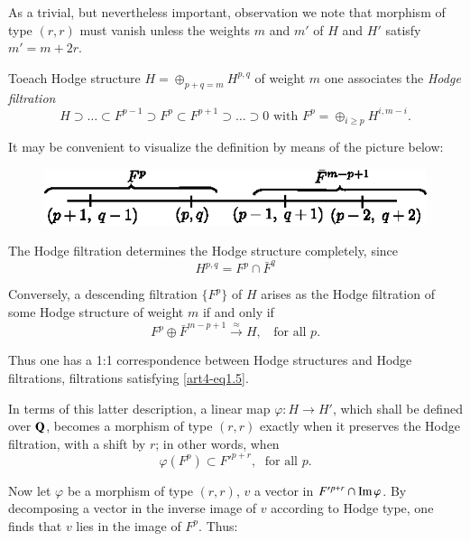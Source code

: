 As a trivial, but nevertheless important, observation we note that morphism of type $(r,r)$ must vanish unless the weights $m$ and $m'$ of $H$ and $H'$ satisfy $m'=m+2r$.

To\pageoriginale each Hodge structure $H = \oplus_{p+q =m} H^{p,q}$ of weight $m$ one associates the \textit{Hodge filtration}
\begin{equation}
H \supset \ldots \subset F^{p-1} \supset F^p \subset F^{p+1} \supset \ldots \supset 0 \text{ with } F^p = \oplus_{i \geqslant p} H^{i, m-i}.  \label{art4-eq1.3}
\end{equation}

It may be convenient to visualize the definition by means of the picture below:
\begin{figure}[H]
\centering
\includegraphics{art4-fig1.eps}
\end{figure}

The Hodge filtration determines the Hodge structure completely, since
\begin{equation}
H^{p,q} = F^p \cap \bar{F}^q \label{art4-eq1.4}
\end{equation}

Conversely, a descending filtration $\{F^p\}$ of $H$ arises as the Hodge filtration of some Hodge structure of weight $m$ if and only if
\begin{equation}
F^p \oplus \bar{F}^{m-p+1} \xrightarrow{\approx} H, \;\; \text{ for all } p.
\label{art4-eq1.5}
\end{equation}

Thus one has a 1:1 correspondence between Hodge structures and Hodge filtrations, \iec filtrations satisfying \eqref{art4-eq1.5}.

In terms of this latter description, a linear map $\varphi: H \to H'$, which shall be defined over $\mathbf{Q}$, becomes a morphism of type $(r, r)$ exactly when it preserves the Hodge filtration, with a shift by $r$; in other words, when 
\begin{equation}
\varphi (F^p) \subset F'^{p+r}, \;\text{ for all }p. \label{art4-eq1.6}
\end{equation}

Now let $\varphi$ be a morphism of type $(r, r)$, $v$ a vector in $F'^{p+r} \cap \operatorname{Im} \varphi$. By decomposing a vector in the inverse image of $v$ according to Hodge type, one finds that $v$ lies in the image of $F^p$. Thus:

